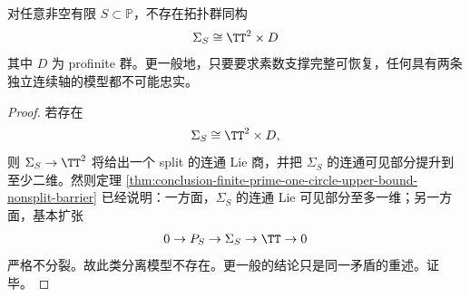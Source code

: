 \begin{corollary}[双连续轴与零维账本的忠实分离模型不存在]\label{cor:conclusion-finite-prime-no-faithful-two-circle-splitting}
对任意非空有限 \(S\subset\mathbb P\)，不存在拓扑群同构
\[
\Sigma_S\cong \TT^2\times D
\]
其中 \(D\) 为 profinite 群。更一般地，只要要求素数支撑完整可恢复，任何具有两条独立连续轴的模型都不可能忠实。
\end{corollary}
\begin{proof}
若存在
\[
\Sigma_S\cong \TT^2\times D,
\]
则 \(\Sigma_S\to \TT^2\) 将给出一个 split 的连通 Lie 商，并把 \(\Sigma_S\) 的连通可见部分提升到至少二维。然则定理 \ref{thm:conclusion-finite-prime-one-circle-upper-bound-nonsplit-barrier} 已经说明：一方面，\(\Sigma_S\) 的连通 Lie 可见部分至多一维；另一方面，基本扩张
\[
0\to P_S\to \Sigma_S\to \TT\to 0
\]
严格不分裂。故此类分离模型不存在。更一般的结论只是同一矛盾的重述。证毕。
\end{proof}

